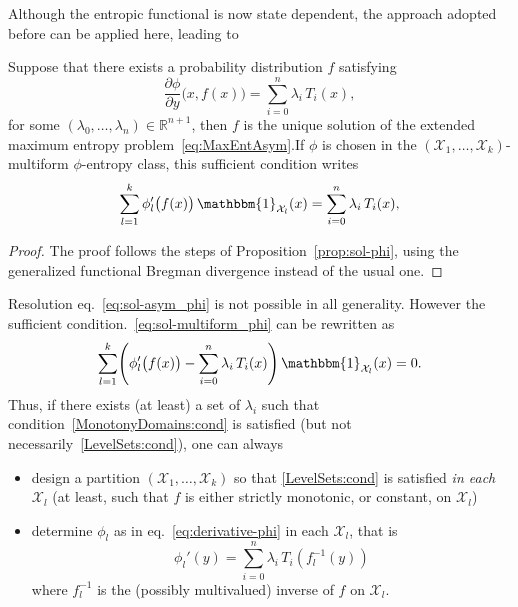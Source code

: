 \documentclass[entropy,article,submit,moreauthors,pdftex]{Definitions/mdpi}
\def\Rset{\mathbb{R}}%
\def\X{\mathcal{X}}%
\def\un{\mathbbm{1}}%
\begin{document}
Although the  entropic functional is  now state dependent, the  approach adopted
before can be applied here, leading to

\begin{Proposition}
\label{prop:sol-asym_phi}
%
  Suppose that there exists a probability distribution $f$ satisfying
  \begin{equation}\label{eq:sol-asym_phi}
  \frac{\partial \phi}{\partial y}\big(x,f(x)\big) = \sum_{i=0}^n \lambda_i \,
  T_i(x),
  \end{equation}
  for  some  $(\lambda_0,\ldots,\lambda_n) \in  \Rset^{n+1}$,  then  $f$ is  the
  unique      solution      of       the      extended      maximum      entropy
  problem~\eqref{eq:MaxEntAsym}.\newline  If $\phi$  is chosen  in the  $(\X_1 ,
  \ldots  , \X_k)$-multiform  $\phi$-entropy  class,  this sufficient  condition
  writes
  \begin{equation}\label{eq:sol-multiform_phi}
  \sum_{l=1}^k \phi_l'\big(f(x)\big) \, \un_{\X_l}(x) = \sum_{i=0}^n \lambda_i
  \, T_i(x),
  \end{equation}
\end{Proposition}
%
\begin{proof}
  The  proof  follows the  steps  of  Proposition~\ref{prop:sol-phi}, using  the
  generalized functional Bregman divergence instead of the usual one.
\end{proof}

Resolution  eq.~\eqref{eq:sol-asym_phi}  is  not  possible  in  all  generality.
However the sufficient  condition.~\eqref{eq:sol-multiform_phi} can be rewritten
as
%
\begin{equation}\label{eq:sol-multiform_phi_partitioned}
\sum_{l=1}^k \left( \phi_l'\big(f(x)\big) - \sum_{i=0}^n \lambda_i \, T_i(x)
\right) \, \un_{\X_l}(x) = 0.
\end{equation}
%
Thus,   if  there   exists  (at   least)  a   set  of   $\lambda_i$  such   that
condition~\ref{MonotonyDomains:cond}       is      satisfied       (but      not
necessarily~\ref{LevelSets:cond}), one can always
%
\begin{itemize}
\item design  a partition  $(\X_1,\ldots,\X_k)$ so that  \ref{LevelSets:cond} is
  satisfied {\em  in each $\X_l$}  (at least, such  that $f$ is  either strictly
  monotonic, or constant, on $\X_l$)
%
\item  determine $\phi_l$  as in  eq.~\eqref{eq:derivative-phi} in  each $\X_l$,
  that is
  \begin{equation}\label{eq:derivative-phil}
  \phi_l'(y) = \sum_{i=0}^n \lambda_i \, T_i \left(f_l^{-1}(y)\right)
  \end{equation}
  where $f_l^{-1}$ is the (possibly multivalued) inverse of $f$ on $\X_l$.
\end{itemize}
\end{document}

